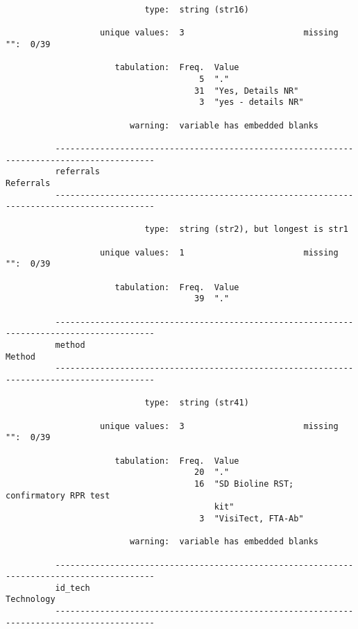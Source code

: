 \documentclass{article}
\begin{document}
\begin{verbatim}
                            type:  string (str16)
          
                   unique values:  3                        missing "":  0/39
          
                      tabulation:  Freq.  Value
                                       5  "."
                                      31  "Yes, Details NR"
                                       3  "yes - details NR"
          
                         warning:  variable has embedded blanks
          
          ------------------------------------------------------------------------------------------
          referrals                                                                        Referrals
          ------------------------------------------------------------------------------------------
          
                            type:  string (str2), but longest is str1
          
                   unique values:  1                        missing "":  0/39
          
                      tabulation:  Freq.  Value
                                      39  "."
          
          ------------------------------------------------------------------------------------------
          method                                                                              Method
          ------------------------------------------------------------------------------------------
          
                            type:  string (str41)
          
                   unique values:  3                        missing "":  0/39
          
                      tabulation:  Freq.  Value
                                      20  "."
                                      16  "SD Bioline RST; confirmatory RPR test
                                          kit"
                                       3  "VisiTect, FTA-Ab"
          
                         warning:  variable has embedded blanks
          
          ------------------------------------------------------------------------------------------
          id_tech                                                                         Technology
          ------------------------------------------------------------------------------------------
          

\end{verbatim}
\end{document}
